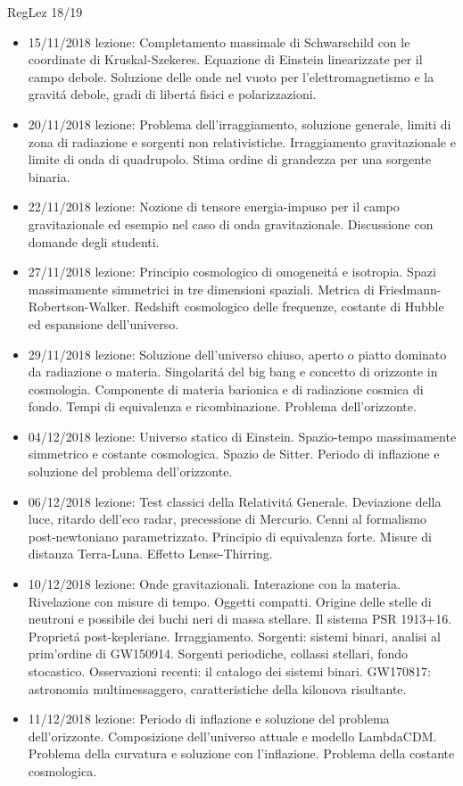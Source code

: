 \begin{frame}[allowframebreaks]{RegLez 18/19}
\begin{itemize}
\item 15/11/2018 lezione: Completamento massimale di Schwarschild con le coordinate di Kruskal-Szekeres. Equazione di Einstein linearizzate per il campo debole. Soluzione delle onde nel vuoto per l'elettromagnetismo e la gravit\'a debole, gradi di libert\'a fisici e polarizzazioni.
\item 20/11/2018 lezione: Problema dell'irraggiamento, soluzione generale, limiti di zona di radiazione e sorgenti non relativistiche. Irraggiamento gravitazionale e limite di onda di quadrupolo. Stima ordine di grandezza per una sorgente binaria.
\item 22/11/2018 lezione: Nozione di tensore energia-impuso per il campo gravitazionale ed esempio nel caso di onda gravitazionale. Discussione con domande degli studenti.
\item 27/11/2018 lezione: Principio cosmologico di omogeneit\'a e isotropia. Spazi massimamente simmetrici in tre dimensioni spaziali. Metrica di Friedmann-Robertson-Walker. Redshift cosmologico delle frequenze, costante di Hubble ed espansione dell'universo.
\item 29/11/2018 lezione: Soluzione dell'universo chiuso, aperto o piatto dominato da radiazione o materia. Singolarit\'a del big bang e concetto di orizzonte in cosmologia. Componente di materia barionica e di radiazione cosmica di fondo. Tempi di equivalenza e ricombinazione. Problema dell'orizzonte.
\item 04/12/2018 lezione: Universo statico di Einstein. Spazio-tempo massimamente simmetrico e costante cosmologica. Spazio de Sitter. Periodo di inflazione e soluzione del problema dell'orizzonte.
\item 06/12/2018 lezione: Test classici della Relativit\'a Generale. Deviazione della luce, ritardo dell'eco radar, precessione di Mercurio. Cenni al formalismo post-newtoniano parametrizzato. Principio di equivalenza forte. Misure di distanza Terra-Luna. Effetto Lense-Thirring.
\item 10/12/2018 lezione: Onde gravitazionali. Interazione con la materia. Rivelazione con misure di tempo. Oggetti compatti. Origine delle stelle di neutroni e possibile dei buchi neri di massa stellare. Il sistema PSR 1913+16. Propriet\'a post-kepleriane. Irraggiamento. Sorgenti: sistemi binari, analisi al prim'ordine di GW150914. Sorgenti periodiche, collassi stellari, fondo stocastico. Osservazioni recenti: il catalogo dei sistemi binari. GW170817: astronomia multimessaggero, caratteristiche della kilonova risultante.
\item 11/12/2018 lezione: Periodo di inflazione e soluzione del problema dell'orizzonte. Composizione dell'universo attuale e modello LambdaCDM. Problema della curvatura e soluzione con l'inflazione. Problema della costante cosmologica.
\end{itemize}
\end{frame}

